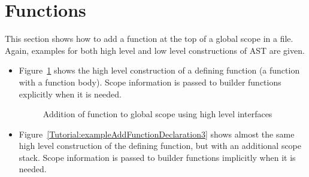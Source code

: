 \section{Functions}
This section shows how to add a function at the top of a global scope in a
file. Again, examples for both high level and low level constructions of AST are given.
\begin{itemize}
\item Figure~\ref{Tutorial:exampleAddFunctionDeclaration2} shows the high
level construction of a defining function (a function  with a function
    body). Scope information is passed to builder functions explicitly when
it is needed.
\begin{figure}[!h]
{\indent
{\mySmallestFontSize
\begin{latexonly}
  
\end{latexonly}

\begin{htmlonly}
   
\end{htmlonly}

}
}
\caption{Addition of function to global scope using high level interfaces}
\label{Tutorial:exampleAddFunctionDeclaration2}
\end{figure}


\item Figure~\ref{Tutorial:exampleAddFunctionDeclaration3} shows almost the
same high level construction of the defining function, but with an
additional scope stack. 
 Scope information is passed to builder functions implicitly when
it is needed.
\begin{figure}[!h]
{\indent
{\mySmallestFontSize
\begin{latexonly}
  
\end{latexonly}

\begin{htmlonly}
   
\end{htmlonly}

}}
\end{figure}
\end{itemize}
